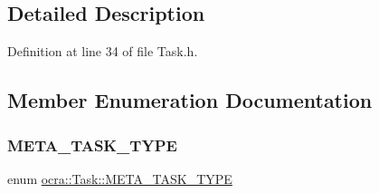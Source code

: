\subsection{Detailed Description}


Definition at line 34 of file Task.\+h.



\subsection{Member Enumeration Documentation}
\hypertarget{classocra_1_1Task_a8ddf2840d178ca273e886c9ca95248fe}{}\label{classocra_1_1Task_a8ddf2840d178ca273e886c9ca95248fe} 
\subsubsection{\texorpdfstring{M\+E\+T\+A\+\_\+\+T\+A\+S\+K\+\_\+\+T\+Y\+PE}{META\_TASK\_TYPE}}
{\footnotesize\ttfamily enum \hyperlink{classocra_1_1Task_a8ddf2840d178ca273e886c9ca95248fe}{ocra\+::\+Task\+::\+M\+E\+T\+A\+\_\+\+T\+A\+S\+K\+\_\+\+T\+Y\+PE}}

